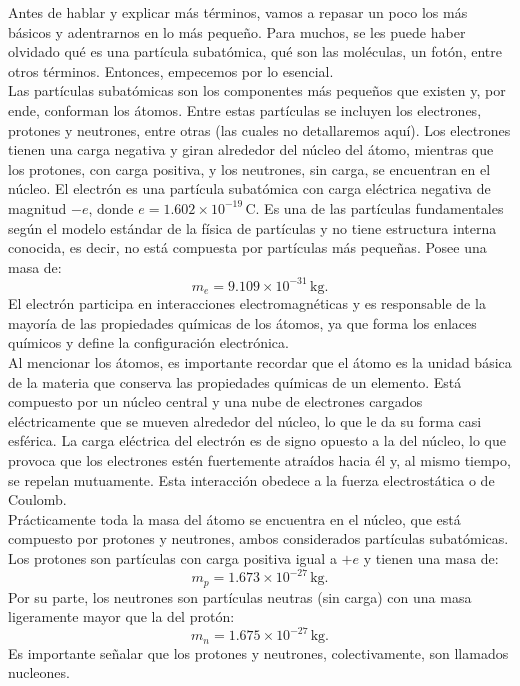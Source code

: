 \noindent 
Antes de hablar y explicar más términos, vamos a repasar un poco los más básicos y adentrarnos en lo más pequeño. Para muchos, se les puede haber olvidado qué es una partícula subatómica, qué son las moléculas, un fotón, entre otros términos. Entonces, empecemos por lo esencial.\\

\noindent 
Las partículas subatómicas son los componentes más pequeños que existen y, por ende, conforman los átomos. Entre estas partículas se incluyen los electrones, protones y neutrones, entre otras (las cuales no detallaremos aquí). Los electrones tienen una carga negativa y giran alrededor del núcleo del átomo, mientras que los protones, con carga positiva, y los neutrones, sin carga, se encuentran en el núcleo. El electrón es una partícula subatómica con carga eléctrica negativa de magnitud $-e$, donde $e = 1.602 \times 10^{-19} \, \text{C}$. Es una de las partículas fundamentales según el modelo estándar de la física de partículas y no tiene estructura interna conocida, es decir, no está compuesta por partículas más pequeñas. Posee una masa de:
\[
m_e = 9.109 \times 10^{-31} \, \text{kg}.
\]
\noindent 
El electrón participa en interacciones electromagnéticas y es responsable de la mayoría de las propiedades químicas de los átomos, ya que forma los enlaces químicos y define la configuración electrónica.\\

\noindent 
Al mencionar los átomos, es importante recordar que el átomo es la unidad básica de la materia que conserva las propiedades químicas de un elemento. Está compuesto por un núcleo central y una nube de electrones cargados eléctricamente que se mueven alrededor del núcleo, lo que le da su forma casi esférica. La carga eléctrica del electrón es de signo opuesto a la del núcleo, lo que provoca que los electrones estén fuertemente atraídos hacia él y, al mismo tiempo, se repelan mutuamente. Esta interacción obedece a la fuerza electrostática o de Coulomb.\\

\noindent 
Prácticamente toda la masa del átomo se encuentra en el núcleo, que está compuesto por protones y neutrones, ambos considerados partículas subatómicas. Los protones son partículas con carga positiva igual a $+e$ y tienen una masa de:
\[
m_p = 1.673 \times 10^{-27} \, \text{kg}.
\]
\noindent 
Por su parte, los neutrones son partículas neutras (sin carga) con una masa ligeramente mayor que la del protón:
\[
m_n = 1.675 \times 10^{-27} \, \text{kg}.
\]
\noindent 
Es importante señalar que los protones y neutrones, colectivamente, son llamados nucleones.\\

